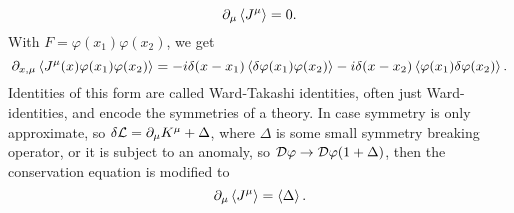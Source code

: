 %
\begin{equation}
    \partial_\mu \Braket{J^\mu} = 0.
\end{equation}
%
With $F = \varphi(x_1) \varphi(x_2)$, we get~\autocite{schwartzQuantumFieldTheory2013,peskinIntroductionQuantumField1995}
%
\begin{equation}
    \partial_{x, \mu} \braket{J^\mu (x)\varphi(x_1) \varphi(x_2)}
    = -i \delta(x - x_1) \braket{\delta \varphi(x_1) \varphi(x_2)}
    - i \delta(x - x_2) \braket{\varphi(x_1) \delta \varphi(x_2)}.
\end{equation}
%
Identities of this form are called Ward-Takashi identities, often just Ward-identities, and encode the symmetries of a theory.
In case symmetry is only approximate, so $\delta \mathcal{L} = \partial_\mu K^\mu + \Delta$, where $\Delta$ is some small symmetry breaking operator, or it is subject to an anomaly, so $\mathcal D \varphi \rightarrow \mathcal D \varphi (1 + \Delta)$, then the conservation equation is modified to
%
\begin{equation}
    \partial_\mu \Braket{J^\mu} = \Braket{\Delta}.
\end{equation}

